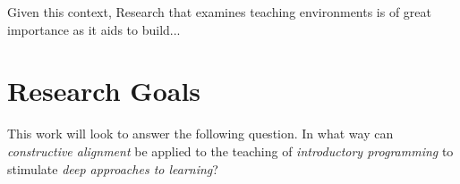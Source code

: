 Given this context, 
Research that examines teaching environments is of great importance as it aids to build...



\section{Research Goals} %
\label{sec:research_goals}

This work will look to answer the following question. In what way can \emph{constructive alignment} be applied to the teaching of \emph{introductory programming} to stimulate \emph{deep approaches to learning}?





